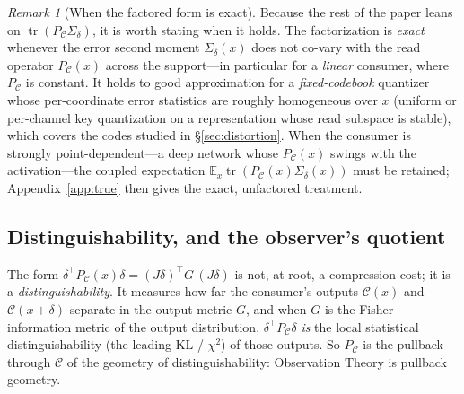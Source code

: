\documentclass[11pt]{article}
\theoremstyle{definition}
\theoremstyle{remark}
\newtheorem*{remark}{Remark}
\newcommand{\PC}{P_{\mathcal{C}}}
\newcommand{\Sd}{\Sigma_{\delta}}
\newcommand{\tr}{\operatorname{tr}}
\newcommand{\E}{\mathbb{E}}
\begin{document}
\begin{remark}[When the factored form is exact]\label{rem:factored}
Because the rest of the paper leans on $\tr(\PC\Sd)$, it is worth stating when it
holds. The factorization is \emph{exact} whenever the error second moment $\Sd(x)$
does not co-vary with the read operator $\PC(x)$ across the support---in particular for
a \emph{linear} consumer, where $\PC$ is constant. It holds to good approximation for
a \emph{fixed-codebook} quantizer whose per-coordinate error statistics are roughly
homogeneous over $x$ (uniform or per-channel key quantization on a representation whose
read subspace is stable), which covers the codes studied in \S\ref{sec:distortion}.
When the consumer is strongly point-dependent---a deep network whose $\PC(x)$ swings
with the activation---the coupled expectation $\E_x\tr(\PC(x)\Sd(x))$ must be retained;
Appendix~\ref{app:true} then gives the exact, unfactored treatment.
\end{remark}

\subsection*{Distinguishability, and the observer's quotient}

The form $\delta^\top\PC(x)\delta=(J\delta)^\top G\,(J\delta)$ is not, at root, a
compression cost; it is a \emph{distinguishability}. It measures how far the
consumer's outputs $\mathcal{C}(x)$ and $\mathcal{C}(x{+}\delta)$ separate in the
output metric $G$, and when $G$ is the Fisher information metric of the output
distribution, $\delta^\top\PC\delta$ \emph{is} the local statistical
distinguishability (the leading KL / $\chi^2$) of those outputs. So $\PC$ is the
pullback through $\mathcal{C}$ of the geometry of distinguishability: Observation
Theory is pullback geometry.
\end{document}
